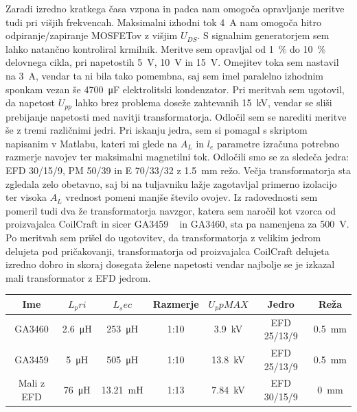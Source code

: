 \documentclass[a4paper,twoside,openright,12pt,Slovene]{book}
\begin{document}
Zaradi izredno kratkega časa vzpona in padca nam omogoča opravljanje meritve tudi pri višjih frekvencah. Maksimalni izhodni tok \SI{4}{\ampere} nam omogoča hitro odpiranje/zapiranje MOSFETov z višjim \(U_{DS}\). S signalnim generatorjem sem lahko natančno kontroliral krmilnik. Meritve sem opravljal od \SI{1}{\percent} do \SI{10}{\percent} delovnega cikla, pri napetostih \SI{5}{\volt}, \SI{10}{\volt} in \SI{15}{\volt}. Omejitev toka sem nastavil na \SI{3}{\ampere}, vendar ta ni bila tako pomembna, saj sem imel paralelno izhodnim sponkam vezan še \SI{4700}{\micro\farad} elektrolitski kondenzator. Pri meritvah sem ugotovil, da napetost \(U_{pp}\) lahko brez problema doseže zahtevanih \SI{15}{\kilo\volt}, vendar se sliši prebijanje napetosti med navitji transformatorja. Odločil sem se narediti meritve še z tremi različnimi jedri. Pri iskanju jedra, sem si pomagal s skriptom napisanim v Matlabu, kateri mi glede na \(A_L\) in \(l_e\) parametre izračuna potrebno razmerje navojev ter maksimalni magnetilni tok. Odločili smo se za sledeča jedra: EFD 30/15/9, PM 50/39 in E 70/33/32 z \SI{1.5}{\milli\meter} režo. Večja transformatorja sta zgledala zelo obetavno, saj bi na tuljavniku lažje zagotavljal primerno izolacijo ter visoka \(A_L\) vrednost pomeni manjše število ovojev. Iz radovednosti sem pomeril tudi dva že transformatorja navzgor, katera sem naročil kot vzorca od proizvajalca CoilCraft in sicer GA3459 ~\cite{Coilcraft:GA3459} in GA3460, sta pa namenjena za \SI{500}{\volt}. Po meritvah sem prišel do ugotovitev, da transformatorja z velikim jedrom delujeta pod pričakovanji, transformatorja od proizvajalca CoilCraft delujeta izredno dobro in skoraj dosegata želene napetosti vendar najbolje se je izkazal mali transformator z EFD jedrom. 
 
\begin{center}
\begin{tabular}{||c|c|c|c|c|c|c||}
\hline
Ime & \(L_pri\) & \(L_sec\) & Razmerje & \(U_ppMAX\) & Jedro & Reža \\ [0.5ex]
\hline\hline
GA3460 & \SI{2.6}{\micro\henry} & \SI{253}{\micro\henry} & 1:10 & \SI{3.9}{\kilo\volt} & EFD 25/13/9 & \SI{0.5}{\milli\meter} \\
\hline
GA3459 & \SI{5}{\micro\henry} & \SI{505}{\micro\henry} & 1:10 & \SI{13.8}{\kilo\volt} & EFD 25/13/9 & \SI{0.5}{\milli\meter} \\
\hline
Mali z EFD & \SI{76}{\micro\henry} & \SI{13.21}{\milli\henry} & 1:13 & \SI{7.84}{\kilo\volt} & EFD 30/15/9 & \SI{0}{\milli\meter} \\
\hline
\end{tabular}

\label{table:1}
\end{center}
\end{document}
